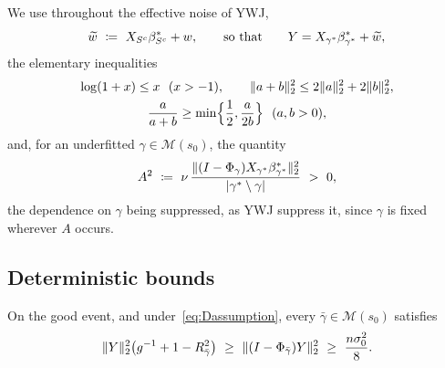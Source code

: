 We use throughout the effective noise of YWJ,
\begin{equation}
    \label{eq:wtilde}
    \widetilde w\ \coloneq\ X_{S^{c}}\beta^\ast_{S^{c}}+w,
    \qquad\text{so that}\qquad
    Y=X_{\gamma^{\ast}}\beta^{\ast}_{\gamma^{\ast}}+\widetilde w ,
\end{equation}
the elementary inequalities
\begin{gather}
    \label{eq:elementary}
    \log(1+x)\leq x\ \ (x>-1),
    \qquad
    \lVert a+b\rVert_2^{2}\leq2\lVert a\rVert_2^{2}+2\lVert b\rVert_2^{2},\\
    \nonumber
    \frac{a}{a+b}\geq\min\Bigl\{\frac12,\frac{a}{2b}\Bigr\}
    \ \ (a,b>0),
\end{gather}
and, for an underfitted $\gamma\in\mathscr{M}(s_0)$, the quantity
\begin{equation}
    \label{eq:Adef}
    A^{2}\ \coloneq\ \nu\,
    \frac{\lVert(I-\Phi_\gamma)X_{\gamma^{\ast}}\beta^{\ast}_{\gamma^{\ast}}\rVert_2^{2}}
    {\lvert\gamma^{\ast}\setminus\gamma\rvert}\ >\ 0 ,
\end{equation}
the dependence on $\gamma$ being suppressed, as YWJ suppress it, since
$\gamma$ is fixed wherever $A$ occurs.


\subsection{Deterministic bounds}
\label{sub:appdet}

\begin{lemma}
    \label{lemma:residual}
    On the good event, and under~\eqref{eq:Dassumption}, every
    $\bar\gamma\in\mathscr{M}(s_0)$ satisfies
    \begin{equation}
        \label{eq:residual}
        \lVert Y\rVert_2^{2}\bigl(g^{-1}+1-R^{2}_{\bar\gamma}\bigr)
        \ \geq\ \lVert(I-\Phi_{\bar\gamma})Y\rVert_2^{2}
        \ \geq\ \frac{n\sigma_0^{2}}{8} .
    \end{equation}
\end{lemma}

